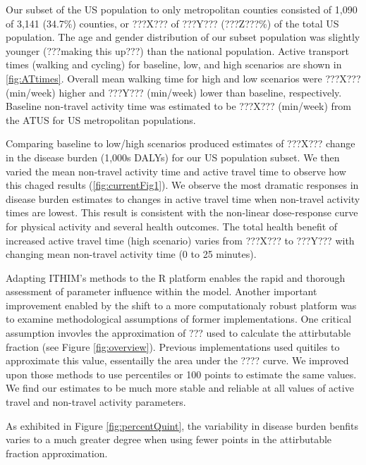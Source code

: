 Our subset of the US population to only metropolitan counties
consisted of 1,090 of 3,141 (34.7\%) counties, or ???X??? of ???Y???
(???Z???\%) of the total US population. The age and gender
distribution of our subset population was slightly younger (???making
this up???) than the national population. Active transport times
(walking and cycling) for baseline, low, and high scenarios are shown
in \ref{fig:ATtimes}. Overall mean walking time for high and low
scenarios were ???X??? (min/week) higher and ???Y??? (min/week) lower
than baseline, respectively. Baseline non-travel activity time was
estimated to be ???X??? (min/week) from the ATUS for US metropolitan
populations.

Comparing baseline to low/high scenarios produced estimates of ???X???
change in the disease burden (1,000s DALYs) for our US population
subset. We then varied the mean non-travel activity time and active
travel time to observe how this chaged results
(\ref{fig:currentFig1}). We observe the most dramatic responses in
disease burden estimates to changes in active travel time when
non-travel activity times are lowest. This result is consistent with
the non-linear dose-response curve for physical activity and several
health outcomes. The total health benefit of increased active travel
time (high scenario) varies from ???X??? to ???Y??? with changing mean
non-travel activity time (0 to 25 minutes).

Adapting ITHIM's methods to the R platform enables the rapid and
thorough assessment of parameter influence within the model. Another
important improvement enabled by the shift to a more computationaly
robust platform was to examine methodological assumptions of former
implementations. One critical assumption invovles the approximation of
??? used to calculate the attirbutable fraction (see
Figure \ref{fig:overview}). Previous implementations used quitiles to
approximate this value, essentailly the area under the ???? curve. We
improved upon those methods to use percentiles or 100 points to
estimate the same values. We find our estimates to be much more stable
and reliable at all values of active travel and non-travel activity
parameters.

As exhibited in Figure \ref{fig:percentQuint}, the variability in
disease burden benfits varies to a much greater degree when using
fewer points in the attirbutable fraction approximation.

